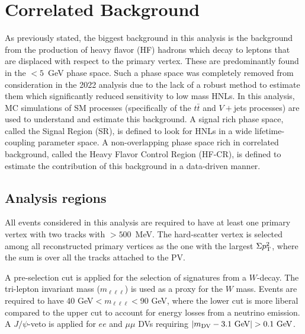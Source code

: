 \section{Correlated Background}\label{sec:corr_bkg}
As previously stated, the biggest background in this analysis is the background from the production of heavy flavor (HF) hadrons which decay to leptons that are displaced with respect to the primary vertex. These are predominantly found in the \mdv$<5$~GeV phase space. Such a phase space was completely removed from consideration in the 2022 analysis due to the lack of a robust method to estimate them which significantly reduced sensitivity to low mass HNLs. In this analysis, MC simulations of SM processes (specifically of the $t\bar{t}$ and $V+$jets processes) are used to understand and estimate this background. A signal rich phase space, called the Signal Region (SR), is defined to look for HNLs in a wide lifetime-coupling parameter space. A non-overlapping phase space rich in correlated background, called the Heavy Flavor Control Region (HF-CR), is defined to estimate the contribution of this background in a data-driven manner.

\subsection{Analysis regions}

All events considered in this analysis are required to have at least one primary vertex with two tracks with \pT$>500$~MeV. The hard-scatter vertex is selected among all reconstructed primary vertices as the one with the largest $\Sigma p_\mathrm{T}^2$, where the sum is over all the tracks attached to the PV.

A pre-selection cut is applied for the selection of signatures from a $W$-decay. The tri-lepton invariant mass ($m_{\ell\ell\ell}$) is used as a proxy for the $W$ mass. Events are required to have 40 GeV$<m_{\ell\ell\ell}<$90 GeV, where the lower cut is more liberal compared to the upper cut to account for energy losses from a neutrino emission. A $J/\psi$-veto is applied for $ee$ and $\mu\mu$ DVs requiring $|\mdv-3.1\text{ GeV}|>0.1\text{ GeV}$.

